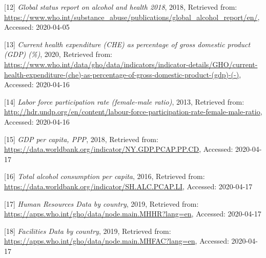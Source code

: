 \documentclass[]{article}
\begin{document}
{[}12{]} \emph{Global status report on alcohol and health 2018}, 2018,
Retrieved from:
\url{https://www.who.int/substance_abuse/publications/global_alcohol_report/en/},
Accessed: 2020-04-05

{[}13{]} \emph{Current health expenditure (CHE) as percentage of gross
domestic product (GDP) (\%)}, 2020, Retrieved from:
\url{https://www.who.int/data/gho/data/indicators/indicator-details/GHO/current-health-expenditure-(che)-as-percentage-of-gross-domestic-product-(gdp)-(-)},
Accessed: 2020-04-16

{[}14{]} \emph{Labor force participation rate (female-male ratio)},
2013, Retrieved from:
\url{http://hdr.undp.org/en/content/labour-force-participation-rate-female-male-ratio},
Accessed: 2020-04-16

{[}15{]} \emph{GDP per capita, PPP}, 2018, Retrieved from:
\url{https://data.worldbank.org/indicator/NY.GDP.PCAP.PP.CD}, Accessed:
2020-04-17

{[}16{]} \emph{Total alcohol consumption per capita}, 2016, Retrieved
from: \url{https://data.worldbank.org/indicator/SH.ALC.PCAP.LI},
Accessed: 2020-04-17

{[}17{]} \emph{Human Resources Data by country}, 2019, Retrieved from:
\url{https://apps.who.int/gho/data/node.main.MHHR?lang=en}, Accessed:
2020-04-17

{[}18{]} \emph{Facilities Data by country}, 2019, Retrieved from:
\url{https://apps.who.int/gho/data/node.main.MHFAC?lang=en}, Accessed:
2020-04-17
\end{document}

